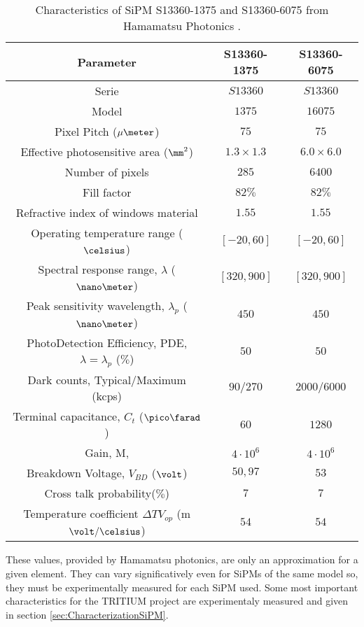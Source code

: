 \begin{table}[h]
\begin{center}
\begin{tabular}{|c|c|c|}
\hline
Parameter & S13360-1375 & S13360-6075 \\
\hline \hline \hline
Serie & $S13360$ & $S13360$ \\ \hline
Model & $1375$ & $16075$ \\ \hline
Pixel Pitch ($\mu\meter$) & $75$ & $75$ \\ \hline
Effective photosensitive area ($\mm^2$) & $1.3 \times 1.3$ & $6.0 \times 6.0$ \\ \hline
Number of pixels & $285$ & $6400$ \\ \hline
Fill factor & $82\%$ & $82\%$ \\ \hline
Refractive index of windows material & $1.55$ & $1.55$ \\ \hline
Operating temperature range ($\celsius$) & $[-20,60]$ & $[-20,60]$ \\ \hline
Spectral response range, $\lambda$ ($\nano\meter$) & $[320, 900]$ & $[320, 900]$ \\ \hline
Peak sensitivity wavelength, $\lambda_p$ ($\nano\meter$) & $450$ & $450$ \\ \hline
PhotoDetection Efficiency, PDE, $\lambda=\lambda_p$ ($\%$) & $50$ & $50$ \\ \hline
Dark counts, Typical/Maximum (kcps) & $90/270$ & $2000/6000$ \\ \hline
Terminal capacitance, $C_t$ ($\pico\farad$) & $60$ & $1280$ \\ \hline
Gain, M, & $4 \cdot{} 10^6$ & $4 \cdot{} 10^6$ \\ \hline
Breakdown Voltage, $V_{BD}$ ($\volt$) & $50,97$ & $53$ \\ \hline
Cross talk probability($\%$) & $7$ & $7$ \\ \hline
Temperature coefficient $\Delta TV_{op}$ (m$\volt/\celsius$) & $54$ & $54$ \\ \hline
\end{tabular}
\caption{Characteristics of SiPM S13360-1375 and S13360-6075 from Hamamatsu Photonics \cite{DataSheetHammamatsu_1_SiPM_1375}.}
\label{tab:PropertiesOfSiPM1375}
\end{center}
\end{table}

These values, provided by Hamamatsu photonics, are only an approximation for a given element. They can vary significatively even for SiPMs of the same model so, they must be experimentally measured for each SiPM used. Some most important characteristics for the TRITIUM project are experimentaly measured and given in section \ref{sec:CharacterizationSiPM}. 

